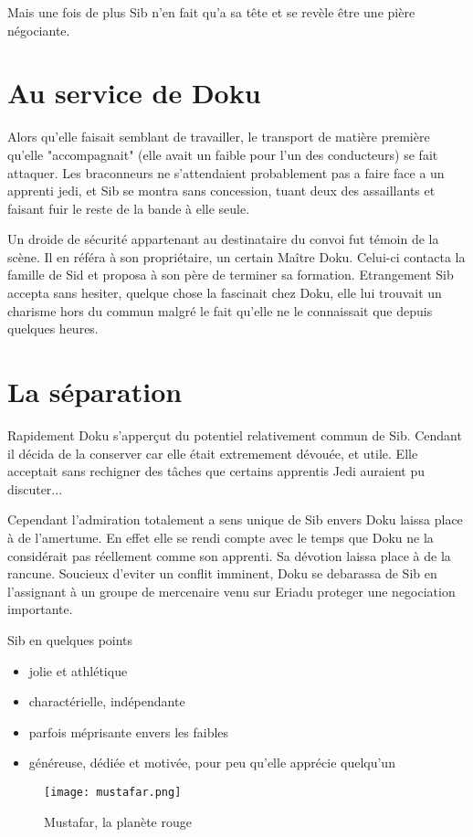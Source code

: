 \documentclass[10pt,a4paper,twoside,twocolumn,openany]{book}
\begin{document}
Mais une fois de plus Sib n'en fait qu'a sa tête et se revèle être une pière négociante.

\section{Au service de Doku}

Alors qu'elle faisait semblant de travailler, le transport de matière première qu'elle "accompagnait" (elle avait un faible pour l'un des conducteurs) se fait attaquer. Les braconneurs ne s'attendaient probablement pas a faire face a un apprenti jedi, et Sib se montra sans concession, tuant deux des assaillants et faisant fuir le reste de la bande à elle seule.   

Un droide de sécurité appartenant au destinataire du convoi fut témoin de la scène. Il en référa à son propriétaire, un certain Maître Doku. Celui-ci contacta la famille de Sid et proposa à son père de terminer sa formation.
Etrangement Sib accepta sans hesiter, quelque chose la fascinait chez Doku, elle lui trouvait un charisme hors \color{white} du commun malgré le fait qu'elle ne le connaissait que depuis quelques heures.

\section{La séparation}
Rapidement Doku s'apperçut du potentiel relativement commun de Sib. Cendant il décida de la conserver car elle était extremement dévouée, et utile. Elle acceptait sans rechigner des tâches que certains apprentis Jedi auraient pu discuter...

Cependant l'admiration totalement a sens unique de Sib envers Doku laissa
place à de l'amertume. En effet elle se rendi compte avec le temps que Doku
 ne la considérait pas réellement comme son apprenti.
Sa dévotion laissa place à de la rancune. Soucieux d'eviter un conflit imminent, Doku se debarassa de Sib en
l'assignant à un groupe de mercenaire venu sur Eriadu proteger une negociation importante.

\begin{commentbox}{Sib en quelques points}

\begin{itemize}
\item jolie et athlétique
\item charactérielle, indépendante
\item parfois méprisante envers les faibles
\item généreuse, dédiée et motivée, pour peu qu'elle apprécie quelqu'un
\end{itemize}

\end{commentbox}

\vspace{2cm}

\begin{figure}
\centering
\texttt{[image: mustafar.png]}
\caption*{\color{white}Mustafar, la planète rouge}
\end{figure}
\end{document}

